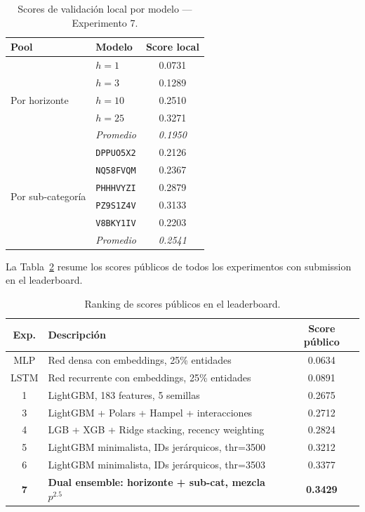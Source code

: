 \documentclass{article}
\begin{document}
\begin{table}[h!]
  \caption{Scores de validación local por modelo — Experimento 7.}
  \label{tab:exp7_scores}
  \centering
  \begin{tabular}{llc}
    \toprule
    Pool & Modelo & Score local \\
    \midrule
    \multirow{5}{*}{Por horizonte}
      & $h=1$   & 0.0731 \\
      & $h=3$   & 0.1289 \\
      & $h=10$  & 0.2510 \\
      & $h=25$  & 0.3271 \\
      & \textit{Promedio} & \textit{0.1950} \\
    \midrule
    \multirow{6}{*}{Por sub-categoría}
      & \texttt{DPPUO5X2} & 0.2126 \\
      & \texttt{NQ58FVQM} & 0.2367 \\
      & \texttt{PHHHVYZI} & 0.2879 \\
      & \texttt{PZ9S1Z4V} & 0.3133 \\
      & \texttt{V8BKY1IV} & 0.2203 \\
      & \textit{Promedio} & \textit{0.2541} \\
    \bottomrule
  \end{tabular}
\end{table}

La Tabla~\ref{tab:resumen_final} resume los scores públicos de todos los experimentos con submission en el leaderboard.

\begin{table}[h!]
  \caption{Ranking de scores públicos en el leaderboard.}
  \label{tab:resumen_final}
  \centering
  \begin{tabular}{clc}
    \toprule
    Exp. & Descripción & Score público \\
    \midrule
    MLP  & Red densa con embeddings, 25\% entidades       & 0.0634 \\
    LSTM & Red recurrente con embeddings, 25\% entidades  & 0.0891 \\
    1    & LightGBM, 183 features, 5 semillas              & 0.2675 \\
    3    & LightGBM + Polars + Hampel + interacciones      & 0.2712 \\
    4    & LGB + XGB + Ridge stacking, recency weighting   & 0.2824 \\
    5    & LightGBM minimalista, IDs jerárquicos, thr=3500 & 0.3212 \\
    6    & LightGBM minimalista, IDs jerárquicos, thr=3503 & 0.3377 \\
    \textbf{7} & \textbf{Dual ensemble: horizonte + sub-cat, mezcla $p^{2.5}$} & \textbf{0.3429} \\
    \bottomrule
  \end{tabular}
\end{table}
\end{document}
